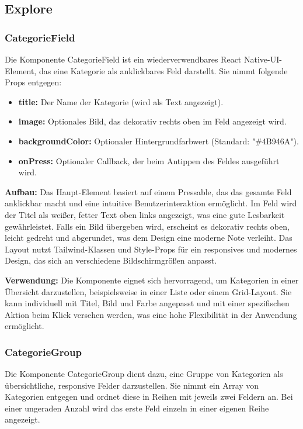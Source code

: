 \subsection{Explore}

\subsubsection{CategorieField}
Die Komponente CategorieField ist ein wiederverwendbares React Native-UI-Element, das eine Kategorie als anklickbares Feld darstellt. Sie nimmt folgende Props entgegen:
\begin{itemize}
    \item \textbf{title:} Der Name der Kategorie (wird als Text angezeigt).
    \item \textbf{image:} Optionales Bild, das dekorativ rechts oben im Feld angezeigt wird.
    \item \textbf{backgroundColor:} Optionaler Hintergrundfarbwert (Standard: "\#4B946A").
    \item \textbf{onPress:} Optionaler Callback, der beim Antippen des Feldes ausgeführt wird.
\end{itemize}

\noindent\textbf{Aufbau:}
Das Haupt-Element basiert auf einem Pressable, das das gesamte Feld anklickbar macht und eine intuitive Benutzerinteraktion ermöglicht. Im Feld wird der Titel als weißer, fetter Text oben links angezeigt, was eine gute Lesbarkeit gewährleistet. Falls ein Bild übergeben wird, erscheint es dekorativ rechts oben, leicht gedreht und abgerundet, was dem Design eine moderne Note verleiht. Das Layout nutzt Tailwind-Klassen und Style-Props für ein responsives und modernes Design, das sich an verschiedene Bildschirmgrößen anpasst.

\noindent\textbf{Verwendung:} Die Komponente eignet sich hervorragend, um Kategorien in einer Übersicht darzustellen, beispielsweise in einer Liste oder einem Grid-Layout. Sie kann individuell mit Titel, Bild und Farbe angepasst und mit einer spezifischen Aktion beim Klick versehen werden, was eine hohe Flexibilität in der Anwendung ermöglicht.

\subsubsection{CategorieGroup}
Die Komponente CategorieGroup dient dazu, eine Gruppe von Kategorien als übersichtliche, responsive Felder darzustellen. Sie nimmt ein Array von Kategorien entgegen und ordnet diese in Reihen mit jeweils zwei Feldern an. Bei einer ungeraden Anzahl wird das erste Feld einzeln in einer eigenen Reihe angezeigt.

